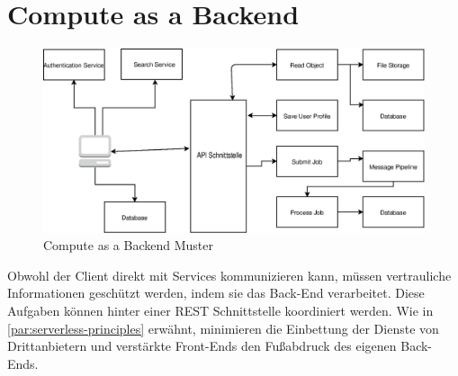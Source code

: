 \documentclass[
12pt,
english,
ngerman,
headsepline,
twoside,
openright,
numbers=noenddot,version=first
]{scrreprt}
\begin{document}
\section{Compute as a Backend}
\begin{figure}[H]
	\centering
		\includegraphics[scale=0.60]{./pics/compute-as-a-backend.eps}
	\caption{Compute as a Backend Muster}
	\label{pic:compute-backend}
\end{figure}
Obwohl der Client direkt mit Services kommunizieren kann, müssen vertrauliche Informationen geschützt werden, indem sie das Back-End verarbeitet\cite{serverlessArchAWS}. Diese Aufgaben können hinter einer \acrshort{REST} Schnittstelle koordiniert werden. Wie in  \autoref{par:serverless-principles} erwähnt, minimieren die Einbettung der Dienste von Drittanbietern und verstärkte Front-Ends den Fußabdruck des eigenen Back-Ends.
\end{document}
